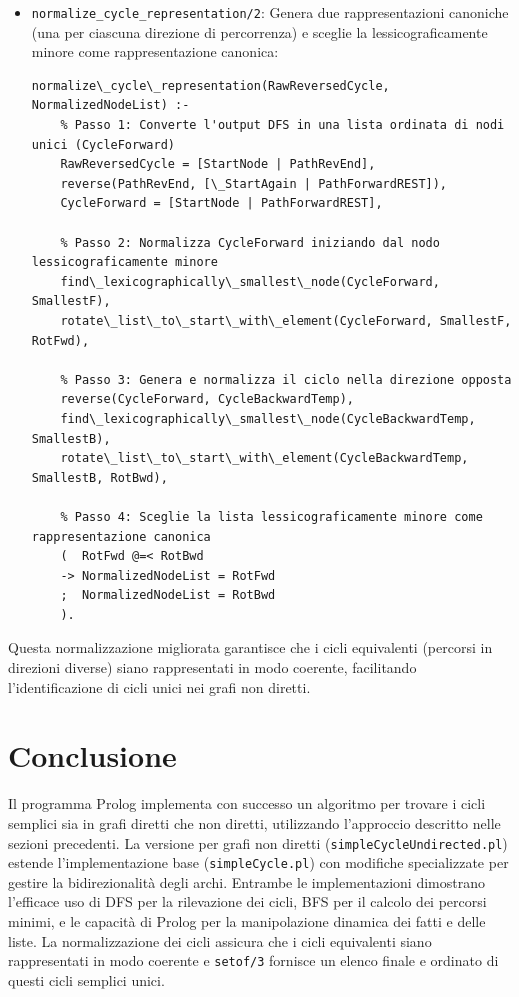 \documentclass[12pt,a4paper]{article}
\begin{document}
\begin{itemize}
\item \texttt{normalize\_cycle\_representation/2}: Genera due rappresentazioni canoniche (una per ciascuna direzione di percorrenza) e sceglie la lessicograficamente minore come rappresentazione canonica:

\begin{lstlisting}[style=prologstyle, basicstyle=\ttfamily\footnotesize]
normalize\_cycle\_representation(RawReversedCycle, NormalizedNodeList) :-
    % Passo 1: Converte l'output DFS in una lista ordinata di nodi unici (CycleForward)
    RawReversedCycle = [StartNode | PathRevEnd],
    reverse(PathRevEnd, [\_StartAgain | PathForwardREST]),
    CycleForward = [StartNode | PathForwardREST],

    % Passo 2: Normalizza CycleForward iniziando dal nodo lessicograficamente minore
    find\_lexicographically\_smallest\_node(CycleForward, SmallestF),
    rotate\_list\_to\_start\_with\_element(CycleForward, SmallestF, RotFwd),

    % Passo 3: Genera e normalizza il ciclo nella direzione opposta
    reverse(CycleForward, CycleBackwardTemp),
    find\_lexicographically\_smallest\_node(CycleBackwardTemp, SmallestB),
    rotate\_list\_to\_start\_with\_element(CycleBackwardTemp, SmallestB, RotBwd),

    % Passo 4: Sceglie la lista lessicograficamente minore come rappresentazione canonica
    (  RotFwd @=< RotBwd
    -> NormalizedNodeList = RotFwd
    ;  NormalizedNodeList = RotBwd
    ).
\end{lstlisting}
\end{itemize}

Questa normalizzazione migliorata garantisce che i cicli equivalenti (percorsi in direzioni diverse) siano rappresentati in modo coerente, facilitando l'identificazione di cicli unici nei grafi non diretti.

\section{Conclusione}
Il programma Prolog implementa con successo un algoritmo per trovare i cicli semplici sia in grafi diretti che non diretti, utilizzando l'approccio descritto nelle sezioni precedenti. La versione per grafi non diretti (\texttt{simpleCycleUndirected.pl}) estende l'implementazione base (\texttt{simpleCycle.pl}) con modifiche specializzate per gestire la bidirezionalità degli archi. Entrambe le implementazioni dimostrano l'efficace uso di DFS per la rilevazione dei cicli, BFS per il calcolo dei percorsi minimi, e le capacità di Prolog per la manipolazione dinamica dei fatti e delle liste. La normalizzazione dei cicli assicura che i cicli equivalenti siano rappresentati in modo coerente e \texttt{setof/3} fornisce un elenco finale e ordinato di questi cicli semplici unici.
\end{document}
